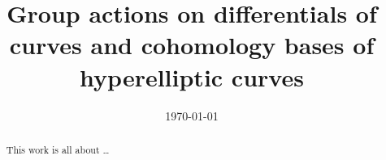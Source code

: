 \documentclass{ecsthesis}      %
\begin{document}
\frontmatter
\title      {Group actions on differentials of curves and cohomology bases of hyperelliptic curves}
\addresses  {\groupname\\\deptname\\\univname}
\date       {\today}
\subject    {}
\keywords   {}
\maketitle
\pagebreak
\pagebreak
\begin{abstract}
This work is all about \dots
\end{abstract}
\tableofcontents
\end{document}
